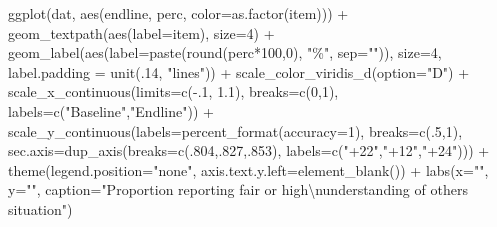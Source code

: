 \documentclass[
  letterpaper,
  DIV=11,
  numbers=noendperiod]{scrreprt}
\newenvironment{Shaded}{\begin{snugshade}}{\end{snugshade}}
\newcommand{\AttributeTok}[1]{\textcolor[rgb]{0.40,0.45,0.13}{#1}}
\newcommand{\DecValTok}[1]{\textcolor[rgb]{0.68,0.00,0.00}{#1}}
\newcommand{\FloatTok}[1]{\textcolor[rgb]{0.68,0.00,0.00}{#1}}
\newcommand{\FunctionTok}[1]{\textcolor[rgb]{0.28,0.35,0.67}{#1}}
\newcommand{\NormalTok}[1]{\textcolor[rgb]{0.00,0.23,0.31}{#1}}
\newcommand{\SpecialCharTok}[1]{\textcolor[rgb]{0.37,0.37,0.37}{#1}}
\newcommand{\StringTok}[1]{\textcolor[rgb]{0.13,0.47,0.30}{#1}}
\begin{document}
\begin{Shaded}
\begin{Highlighting}[]
\FunctionTok{ggplot}\NormalTok{(dat, }\FunctionTok{aes}\NormalTok{(endline, perc, }\AttributeTok{color=}\FunctionTok{as.factor}\NormalTok{(item))) }\SpecialCharTok{+} 
  \FunctionTok{geom\_textpath}\NormalTok{(}\FunctionTok{aes}\NormalTok{(}\AttributeTok{label=}\NormalTok{item),}
                \AttributeTok{size=}\DecValTok{4}\NormalTok{) }\SpecialCharTok{+}
  \FunctionTok{geom\_label}\NormalTok{(}\FunctionTok{aes}\NormalTok{(}\AttributeTok{label=}\FunctionTok{paste}\NormalTok{(}\FunctionTok{round}\NormalTok{(perc}\SpecialCharTok{*}\DecValTok{100}\NormalTok{,}\DecValTok{0}\NormalTok{), }\StringTok{"\%"}\NormalTok{, }\AttributeTok{sep=}\StringTok{""}\NormalTok{)),}
             \AttributeTok{size=}\DecValTok{4}\NormalTok{,}
             \AttributeTok{label.padding =} \FunctionTok{unit}\NormalTok{(.}\DecValTok{14}\NormalTok{, }\StringTok{"lines"}\NormalTok{)) }\SpecialCharTok{+}
  \FunctionTok{scale\_color\_viridis\_d}\NormalTok{(}\AttributeTok{option=}\StringTok{"D"}\NormalTok{) }\SpecialCharTok{+}
  \FunctionTok{scale\_x\_continuous}\NormalTok{(}\AttributeTok{limits=}\FunctionTok{c}\NormalTok{(}\SpecialCharTok{{-}}\NormalTok{.}\DecValTok{1}\NormalTok{, }\FloatTok{1.1}\NormalTok{),}
                     \AttributeTok{breaks=}\FunctionTok{c}\NormalTok{(}\DecValTok{0}\NormalTok{,}\DecValTok{1}\NormalTok{),}
                     \AttributeTok{labels=}\FunctionTok{c}\NormalTok{(}\StringTok{"Baseline"}\NormalTok{,}\StringTok{"Endline"}\NormalTok{)) }\SpecialCharTok{+}
  \FunctionTok{scale\_y\_continuous}\NormalTok{(}\AttributeTok{labels=}\FunctionTok{percent\_format}\NormalTok{(}\AttributeTok{accuracy=}\DecValTok{1}\NormalTok{),}
                     \AttributeTok{breaks=}\FunctionTok{c}\NormalTok{(.}\DecValTok{5}\NormalTok{,}\DecValTok{1}\NormalTok{),}
                     \AttributeTok{sec.axis=}\FunctionTok{dup\_axis}\NormalTok{(}\AttributeTok{breaks=}\FunctionTok{c}\NormalTok{(.}\DecValTok{804}\NormalTok{,.}\DecValTok{827}\NormalTok{,.}\DecValTok{853}\NormalTok{),}
                                       \AttributeTok{labels=}\FunctionTok{c}\NormalTok{(}\StringTok{"+22"}\NormalTok{,}\StringTok{"+12"}\NormalTok{,}\StringTok{"+24"}\NormalTok{))) }\SpecialCharTok{+}
  \FunctionTok{theme}\NormalTok{(}\AttributeTok{legend.position=}\StringTok{"none"}\NormalTok{,}
        \AttributeTok{axis.text.y.left=}\FunctionTok{element\_blank}\NormalTok{()) }\SpecialCharTok{+}
  \FunctionTok{labs}\NormalTok{(}\AttributeTok{x=}\StringTok{""}\NormalTok{,}
       \AttributeTok{y=}\StringTok{""}\NormalTok{,}
       \AttributeTok{caption=}\StringTok{"Proportion reporting fair or high}\SpecialCharTok{\textbackslash{}n}\StringTok{understanding of others\textquotesingle{} situation"}\NormalTok{)}
\end{Highlighting}
\end{Shaded}
\end{document}
